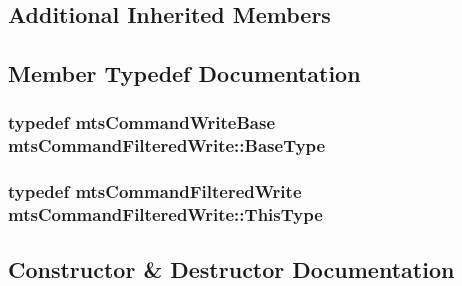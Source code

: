\subsection*{Additional Inherited Members}


\subsection{Member Typedef Documentation}
\hypertarget{classmts_command_filtered_write_af0fe1d0192120a875d65d2ba14f665ef}{}
\subsubsection[{Base\+Type}]{\setlength{\rightskip}{0pt plus 5cm}typedef {\bf mts\+Command\+Write\+Base} {\bf mts\+Command\+Filtered\+Write\+::\+Base\+Type}}\label{classmts_command_filtered_write_af0fe1d0192120a875d65d2ba14f665ef}
\hypertarget{classmts_command_filtered_write_a397cd5406f1cf05ebdf94ec5050dbe20}{}
\subsubsection[{This\+Type}]{\setlength{\rightskip}{0pt plus 5cm}typedef {\bf mts\+Command\+Filtered\+Write} {\bf mts\+Command\+Filtered\+Write\+::\+This\+Type}}\label{classmts_command_filtered_write_a397cd5406f1cf05ebdf94ec5050dbe20}


\subsection{Constructor \& Destructor Documentation}
\hypertarget{classmts_command_filtered_write_a36beea3289b7379db2819fb5aea65b9a}{}
